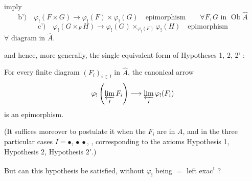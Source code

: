 
imply
\[
\text{b')}\quad\varphi_!(F\times G)\longrightarrow\varphi_!(F)\times\varphi_!(G)\quad\text{epimorphism}
\qquad\forall F,G\text{ in }\operatorname{Ob}\widehat A
\]
\[
\text{c')}\quad\varphi_!(G\times_F H)\longrightarrow
\varphi_!(G)\times_{\varphi_!(F)}\varphi_!(H)\quad\text{epimorphism}
\]
$\forall$ diagram
in $\widehat A$.

and hence, more generally, the single equivalent form of Hypotheses 1, 2, 2' :

For every finite diagram $(F_i)_{i\in I}$ in $\widehat A$, the canonical arrow
\[
\varphi_!\left(\varprojlim_I F_i\right)\longrightarrow\varprojlim_I\varphi_!(F_i)
\]
is an epimorphism.

(It suffices moreover to postulate it when the $F_i$ are in $A$, and in the three particular cases $I=\bullet$, $\bullet\ \bullet$,
\diagram{\begin{tikzcd}[ampersand replacement=\&,column sep=tiny,row sep=tiny]
\bullet\arrow[dr]\&\&\bullet\arrow[dl]\\
\&\bullet\&
\end{tikzcd}}, corresponding to the axioms Hypothesis 1, Hypothesis 2, Hypothesis $2'$.)

But can this hypothesis be satisfied, without $\varphi_!$ being $=$ left exac\textsuperscript{t} ?

